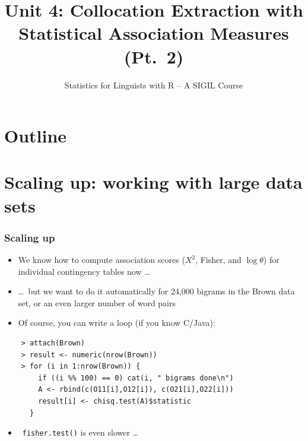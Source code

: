 \documentclass[t]{beamer} %
\title[4b.\ Collocations (part 2)]{Unit 4: Collocation Extraction with
  Statistical Association Measures (Pt.~2)}
\subtitle{Statistics for Linguists with R -- A SIGIL Course}
\begin{document}
\frame{\titlepage}


\section*{Outline}

\section{Scaling up: working with large data sets}

\begin{frame}[fragile]
  \frametitle{Scaling up}

  \begin{itemize}
  \item We know how to compute association scores ($X^2$, Fisher, and $\log
    \theta$) for individual contingency tables now \ldots\pause
  \item[] \ldots\ but we want to do it automatically for 24,000 bigrams in the
    Brown data set, or an even larger number of word pairs%
    \pause
  \item Of course, you can write a loop (if you know C/Java):
  \end{itemize}
  
\begin{verbatim}
    > attach(Brown)
    > result <- numeric(nrow(Brown))
    > for (i in 1:nrow(Brown)) {
        if ((i %% 100) == 0) cat(i, " bigrams done\n")
        A <- rbind(c(O11[i],O12[i]), c(O21[i],O22[i]))
        result[i] <- chisq.test(A)$statistic
      }
\end{verbatim}

  \begin{itemize}
  \item[] \hand\ \verb|fisher.test()| is even slower \ldots
  \end{itemize}
\end{frame}
\end{document}

